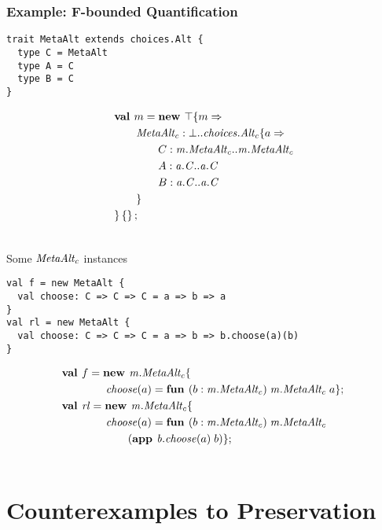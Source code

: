 \documentclass{beamer}
\begin{document}
\begin{frame}[fragile]
\frametitle{Example: F-bounded Quantification}
\begin{verbatim}
trait MetaAlt extends choices.Alt {
  type C = MetaAlt
  type A = C
  type B = C
}
\end{verbatim}
\begin{align*}
&\textbf{val }m = \textbf{new }\top \{m \Rightarrow \\
&\quad\quad\mathit{MetaAlt_c} : \bot..{\mathit{choices.Alt_c}} \{a \Rightarrow \\
&\quad\quad\quad\quad C : \mathit{m.MetaAlt_c}..\mathit{m.MetaAlt_c}\\
&\quad\quad\quad\quad A : \mathit{a.C}..\mathit{a.C}\\
&\quad\quad\quad\quad B : \mathit{a.C}..\mathit{a.C}\\
&\quad\quad \}\\
& \}\left\{\right\} ;\;\\&
\end{align*}
\end{frame}

\begin{frame}[fragile]{Some ${\mathit{MetaAlt_c}}$ instances}
\begin{verbatim}
val f = new MetaAlt {
  val choose: C => C => C = a => b => a
}
val rl = new MetaAlt {
  val choose: C => C => C = a => b => b.choose(a)(b)
}
\end{verbatim}
\begin{align*}
&\mlnew f {{\mi{m.MetaAlt_c}}\mlldefs{\\
&\gap\gap\mi{choose}(a)=\fun b {\mi{m.MetaAlt_c}} {\mi{m.MetaAlt_c}} a}}{
\mlnew {\mi{rl}} {{\mi{m.MetaAlt_c}}\mlldefs{\\
&\gap\gap\mi{choose}(a)=\fun b {\mi{m.MetaAlt_c}} {\mi{m.MetaAlt_c}} {\\
&\gap\gap\gap \app {{\mi{b.choose}}(a)} b}}}{
}}
\end{align*}
\end{frame}

\section{Counterexamples to Preservation}
\end{document}
